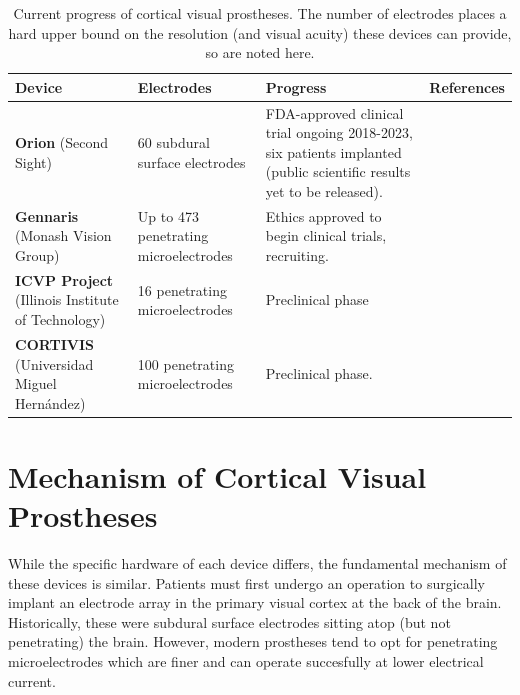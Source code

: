 \documentclass[a4paper,11pt,openany]{book}
\begin{document}
\begin{table}[htbp]
\caption[Current progress of cortical visual prostheses]{\label{tab:org7a7e0b1}
Current progress of cortical visual prostheses. The number of electrodes places a hard upper bound on the resolution (and visual acuity) these devices can provide, so are noted here.}
\centering
\scriptsize
\begin{tabu} to \textwidth {XXXl}
Device & Electrodes & Progress & References\\
\hline
\textbf{Orion} \newline (Second Sight) & 60 subdural surface electrodes & FDA-approved clinical trial ongoing 2018-2023, six patients implanted (public scientific results yet to be released). & \cite{secondsight_early_nodate,secondsight_second_nodate,niketeghad_brain_2019}\\
\textbf{Gennaris} \newline (Monash Vision Group) & Up to 473 penetrating microelectrodes & Ethics approved to begin clinical trials, recruiting. & \cite{lowery_monash_2017,lowery_restoration_2015,anzctr_first_2018}\\
\textbf{ICVP Project} \newline (Illinois Institute of Technology) & 16 penetrating microelectrodes & Preclinical phase & \cite{troyk_intracortical_2017}\\
\textbf{CORTIVIS} \newline (Universidad Miguel Hernández) & 100 penetrating microelectrodes & Preclinical phase. & \cite{fernandez_cortivis_2017}\\
\end{tabu}
\end{table}

\section*{Mechanism of Cortical Visual Prostheses}
\label{sec:org0fc6f2e}

While the specific hardware of each device differs, the fundamental mechanism of these devices is similar.
Patients must first undergo an operation to surgically implant an electrode array in the primary visual cortex at the back of the brain. \cite{lewis_restoration_2015}
Historically, these were subdural surface electrodes sitting atop (but not penetrating) the brain. \cite{brindley_sensations_1968,dobelle_phosphenes_1974}
However, modern prostheses tend to opt for penetrating microelectrodes \cite{lowery_monash_2017,troyk_intracortical_2017,fernandez_cortivis_2017} which are finer and can operate succesfully at lower electrical current. \cite{bak_visual_1990,schmidt_feasibility_1996}
\end{document}
